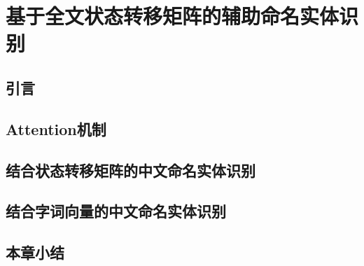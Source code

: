 \chapter{基于全文状态转移矩阵的辅助命名实体识别}
\section{引言}
\section{Attention机制}
\section{结合状态转移矩阵的中文命名实体识别}
\section{结合字词向量的中文命名实体识别}
\section{本章小结}